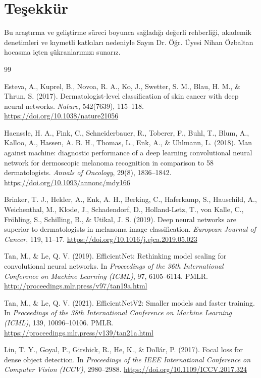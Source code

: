 \documentclass[12pt,a4paper]{article}
\begin{document}
\section*{Teşekkür}
Bu araştırma ve geliştirme süreci boyunca sağladığı değerli rehberliği, akademik denetimleri ve kıymetli katkıları nedeniyle Sayın Dr. Öğr. Üyesi Nihan Özbaltan hocasına içten şükranlarımızı sunarız.

\newpage

\begin{thebibliography}{99}

Esteva, A., Kuprel, B., Novoa, R. A., Ko, J., Swetter, S. M., Blau, H. M., \& Thrun, S. (2017). Dermatologist-level classification of skin cancer with deep neural networks. \textit{Nature}, 542(7639), 115--118. \url{https://doi.org/10.1038/nature21056}

Haenssle, H. A., Fink, C., Schneiderbauer, R., Toberer, F., Buhl, T., Blum, A., Kalloo, A., Hassen, A. B. H., Thomas, L., Enk, A., \& Uhlmann, L. (2018). Man against machine: diagnostic performance of a deep learning convolutional neural network for dermoscopic melanoma recognition in comparison to 58 dermatologists. \textit{Annals of Oncology}, 29(8), 1836--1842. \url{https://doi.org/10.1093/annonc/mdy166}

Brinker, T. J., Hekler, A., Enk, A. H., Berking, C., Haferkamp, S., Hauschild, A., Weichenthal, M., Klode, J., Schadendorf, D., Holland-Letz, T., von Kalle, C., Fröhling, S., Schilling, B., \& Utikal, J. S. (2019). Deep neural networks are superior to dermatologists in melanoma image classification. \textit{European Journal of Cancer}, 119, 11--17. \url{https://doi.org/10.1016/j.ejca.2019.05.023}

Tan, M., \& Le, Q. V. (2019). EfficientNet: Rethinking model scaling for convolutional neural networks. In \textit{Proceedings of the 36th International Conference on Machine Learning (ICML)}, 97, 6105--6114. PMLR. \url{http://proceedings.mlr.press/v97/tan19a.html}

Tan, M., \& Le, Q. V. (2021). EfficientNetV2: Smaller models and faster training. In \textit{Proceedings of the 38th International Conference on Machine Learning (ICML)}, 139, 10096--10106. PMLR. \url{https://proceedings.mlr.press/v139/tan21a.html}

Lin, T. Y., Goyal, P., Girshick, R., He, K., \& Dollár, P. (2017). Focal loss for dense object detection. In \textit{Proceedings of the IEEE International Conference on Computer Vision (ICCV)}, 2980--2988. \url{https://doi.org/10.1109/ICCV.2017.324}


\end{thebibliography}
\end{document}
